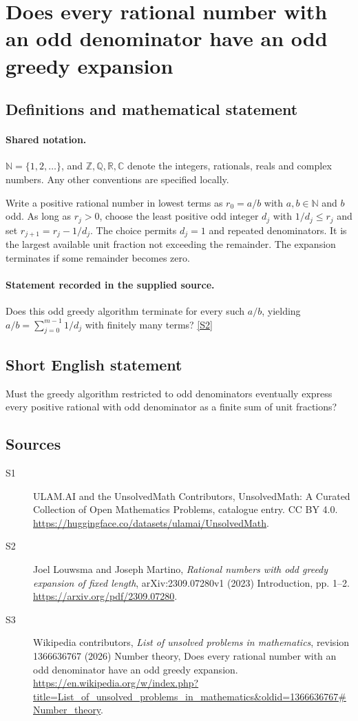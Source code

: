 \documentclass[11pt]{article}
\newcommand{\sref}[2]{\hyperlink{source:#1:#2}{[S#2]}}
\begin{document}
\section{Does every rational number with an odd denominator have an odd greedy expansion}\label{statement}

\subsection{Definitions and mathematical statement}

\paragraph{Shared notation.}$\mathbb N=\{1,2,\ldots\}$, and $\mathbb Z,\mathbb Q,\mathbb R,\mathbb C$ denote the integers, rationals, reals and complex numbers. Any other conventions are specified locally.


Write a positive rational number in lowest terms as $r_0=a/b$ with $a,b\in\mathbb N$ and $b$ odd. As long as $r_j>0$, choose the least positive odd integer $d_j$ with $1/d_j\le r_j$ and set $r_{j+1}=r_j-1/d_j$. The choice permits $d_j=1$ and repeated denominators. It is the largest available unit fraction not exceeding the remainder. The expansion terminates if some remainder becomes zero.
\paragraph{Statement recorded in the supplied source.}
Does this odd greedy algorithm terminate for every such $a/b$, yielding $a/b=\sum_{j=0}^{m-1}1/d_j$ with finitely many terms? \sref{statement}{2}
\subsection{Short English statement}
Must the greedy algorithm restricted to odd denominators eventually express every positive rational with odd denominator as a finite sum of unit fractions?
\subsection{Sources}
\begin{description}
\item[\hypertarget{source:statement:1}{S1}] ULAM.AI and the UnsolvedMath Contributors, UnsolvedMath: A Curated Collection of Open Mathematics Problems, catalogue entry. CC BY 4.0. \url{https://huggingface.co/datasets/ulamai/UnsolvedMath}.
\item[\hypertarget{source:statement:2}{S2}] Joel Louwsma and Joseph Martino, \emph{Rational numbers with odd greedy expansion of fixed length}, arXiv:2309.07280v1 (2023) Introduction, pp. 1--2. \url{https://arxiv.org/pdf/2309.07280}.
\item[\hypertarget{source:statement:3}{S3}] Wikipedia contributors, \emph{List of unsolved problems in mathematics}, revision 1366636767 (2026) Number theory, Does every rational number with an odd denominator have an odd greedy expansion. \url{https://en.wikipedia.org/w/index.php?title=List_of_unsolved_problems_in_mathematics&oldid=1366636767#Number_theory}.
\end{description}
\label{end:statement}
\end{document}
